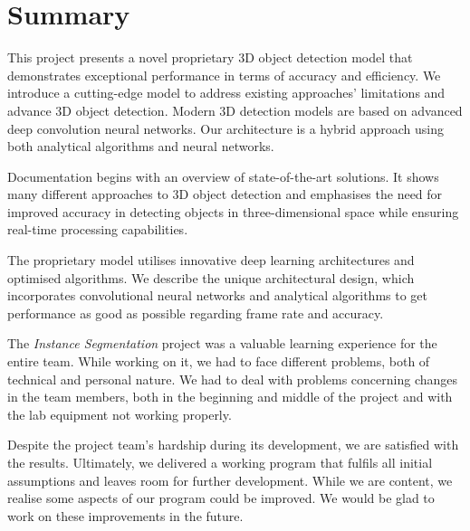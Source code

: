 \chapter{Summary}
This project presents a novel proprietary 3D object detection model that demonstrates exceptional performance in terms of accuracy and efficiency. We introduce a cutting-edge model to address existing approaches' limitations and advance 3D object detection. Modern 3D detection models are based on advanced deep convolution neural networks. Our architecture is a hybrid approach using both analytical algorithms and neural networks.

Documentation begins with an overview of state-of-the-art solutions. It shows many different approaches to 3D object detection and emphasises the need for improved accuracy in detecting objects in three-dimensional space while ensuring real-time processing capabilities.

The proprietary model utilises innovative deep learning architectures and optimised algorithms. We describe the unique architectural design, which incorporates convolutional neural networks and analytical algorithms to get performance as good as possible regarding frame rate and accuracy. 

The \textit{Instance Segmentation} project was a valuable learning experience for the entire team. While working on it, we had to face different problems, both of technical and personal nature. We had to deal with problems concerning changes in the team members, both in the beginning and middle of the project and with the lab equipment not working properly.

Despite the project team's hardship during its development, we are satisfied with the results. Ultimately, we delivered a working program that fulfils all initial assumptions and leaves room for further development. While we are content, we realise some aspects of our program could be improved. We would be glad to work on these improvements in the future.
